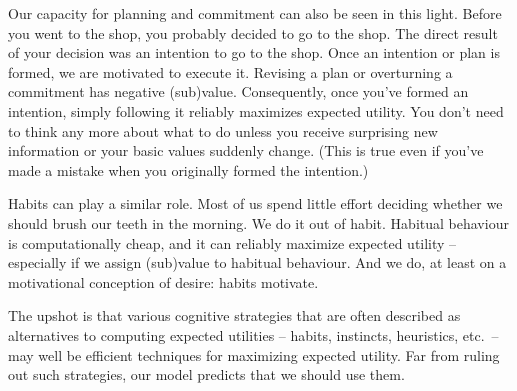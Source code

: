 Our capacity for planning and commitment can also be seen in this light. Before
you went to the shop, you probably decided to go to the shop. The direct result
of your decision was an intention to go to the shop.%
%
%
Once an intention or plan is formed, we are motivated to execute it. Revising a
plan or overturning a commitment has negative (sub)value. Consequently, once
you've formed an intention, simply following it reliably maximizes expected
utility. You don't need to think any more about what to do unless you receive
surprising new information or your basic values suddenly change. (This is true
even if you've made a mistake when you originally formed the intention.)

Habits can play a similar role. Most of us spend little effort deciding whether
we should brush our teeth in the morning. We do it out of habit. Habitual
behaviour is computationally cheap, and it can reliably maximize expected
utility -- especially if we assign (sub)value to habitual behaviour. And we do,
at least on a motivational conception of desire: habits motivate.

The upshot is that various cognitive strategies that are often described as
alternatives to computing expected utilities -- habits, instincts, heuristics,
etc.\ -- may well be efficient techniques for maximizing expected utility. Far
from ruling out such strategies, our model predicts that we should use them.


